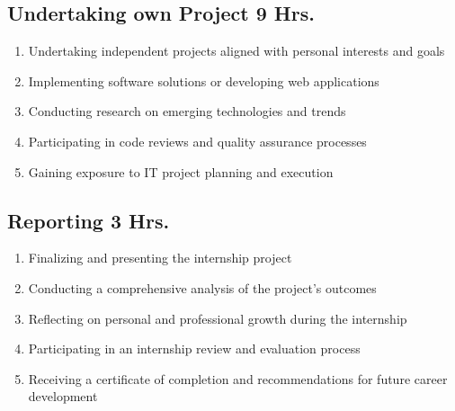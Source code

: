 \subsection{Undertaking own Project \hfill 9 Hrs.}
\begin{enumerate}
    \item Undertaking independent projects aligned with personal interests and goals
    \item Implementing software solutions or developing web applications
    \item Conducting research on emerging technologies and trends
    \item Participating in code reviews and quality assurance processes
    \item Gaining exposure to IT project planning and execution
    
\end{enumerate}


\subsection{Reporting \hfill 3 Hrs.}
\begin{enumerate}
    \item Finalizing and presenting the internship project
    \item Conducting a comprehensive analysis of the project's outcomes
    \item Reflecting on personal and professional growth during the internship
    \item Participating in an internship review and evaluation process
    \item Receiving a certificate of completion and recommendations for future career development
\end{enumerate}

